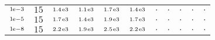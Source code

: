 \begin{tiny}
\begin{tabular}{@{$\;$}c@{$\;$}|@{$\;$}c@{$\;$}@{$\;$}c@{$\;$}@{$\;$}c@{$\;$}@{$\;$}c@{$\;$}@{$\;$}c@{$\;$}|@{$\;$}c@{$\;$}@{$\;$}c@{$\;$}@{$\;$}c@{$\;$}@{$\;$}c@{$\;$}@{$\;$}c@{$\;$}}
$\scriptstyle1\!\mathrm{\hspace{0.10em}e}-3$ & $\scriptstyle15$ & $\scriptstyle1.4\mathrm{\hspace{0.10em}e}3$ & $\scriptstyle1.1\mathrm{\hspace{0.10em}e}3$ & $\scriptstyle1.7\mathrm{\hspace{0.10em}e}3$ & $\scriptstyle1.4\mathrm{\hspace{0.10em}e}3$ & $\scriptstyle.$ & $\scriptstyle.$ & $\scriptstyle.$ & $\scriptstyle.$ & $\scriptstyle.$\\ 
$\scriptstyle1\!\mathrm{\hspace{0.10em}e}-5$ & $\scriptstyle15$ & $\scriptstyle1.7\mathrm{\hspace{0.10em}e}3$ & $\scriptstyle1.4\mathrm{\hspace{0.10em}e}3$ & $\scriptstyle1.9\mathrm{\hspace{0.10em}e}3$ & $\scriptstyle1.7\mathrm{\hspace{0.10em}e}3$ & $\scriptstyle.$ & $\scriptstyle.$ & $\scriptstyle.$ & $\scriptstyle.$ & $\scriptstyle.$\\ 
$\scriptstyle1\!\mathrm{\hspace{0.10em}e}-8$ & $\scriptstyle15$ & $\scriptstyle2.2\mathrm{\hspace{0.10em}e}3$ & $\scriptstyle1.9\mathrm{\hspace{0.10em}e}3$ & $\scriptstyle2.5\mathrm{\hspace{0.10em}e}3$ & $\scriptstyle2.2\mathrm{\hspace{0.10em}e}3$ & $\scriptstyle.$ & $\scriptstyle.$ & $\scriptstyle.$ & $\scriptstyle.$ & $\scriptstyle.$\\ 
\end{tabular} 
\end{tiny} 
